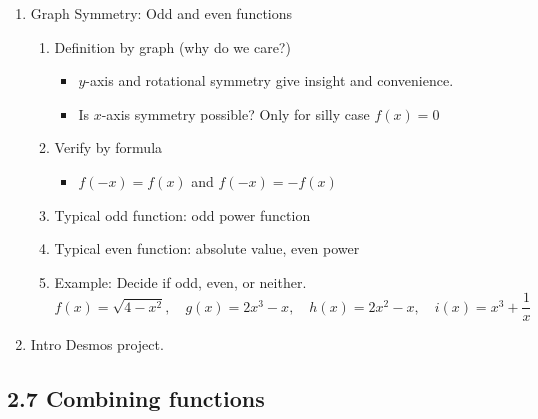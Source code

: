 \documentclass{article}
\begin{document}
\begin{enumerate}
\item Graph Symmetry: Odd and even functions
\begin{enumerate}
\item Definition by graph (why do we care?)
\begin{itemize}
\item $y$-axis and rotational symmetry give insight and convenience.
\item Is $x$-axis symmetry possible? Only for silly case $f(x)=0$
\end{itemize}
\item Verify by formula
\begin{itemize}
\item $f(-x)=f(x)$ and $f(-x)=-f(x)$
\end{itemize}
\item Typical odd function: odd power function
\item Typical even function: absolute value, even power 
\item Example: Decide if odd, even, or neither.
\[
f(x) = \sqrt{4-x^2}, \quad g(x) = 2x^3-x, \quad h(x) = 2x^2-x,  \quad i(x) = x^3 + \frac{1}{x}
\]
\end{enumerate}

\item Intro Desmos project.
\end{enumerate}

\subsection{2.7 Combining functions}
\end{document}

